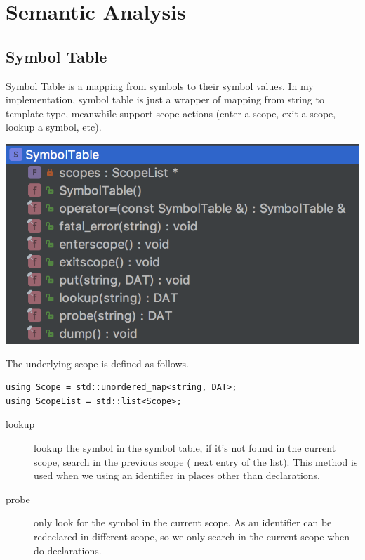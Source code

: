 \documentclass[11pt]{article}
\begin{document}
\section{Semantic Analysis}
\label{sec:orgheadline18}
\subsection{Symbol Table}
\label{sec:orgheadline9}
Symbol Table is a mapping from symbols to their symbol values. In my
implementation, symbol table is just a wrapper of mapping from string to
template type, meanwhile support scope actions (enter a scope, exit a scope,
lookup a symbol, etc).

\includegraphics[width=.9\linewidth]{img/symtab.png}

The underlying scope is defined as follows.
\begin{verbatim}
using Scope = std::unordered_map<string, DAT>;
using ScopeList = std::list<Scope>;
\end{verbatim}

\begin{description}
\item[{lookup}] lookup the symbol in the symbol table, if it's not found in the
current scope, search in the previous scope ( next entry of the list). This
method is used when we using an identifier in places other than declarations.
\item[{probe}] only look for the symbol in the current scope. As an identifier can
be redeclared in different scope, so we only search in the current scope
when do declarations.
\end{description}
\end{document}
